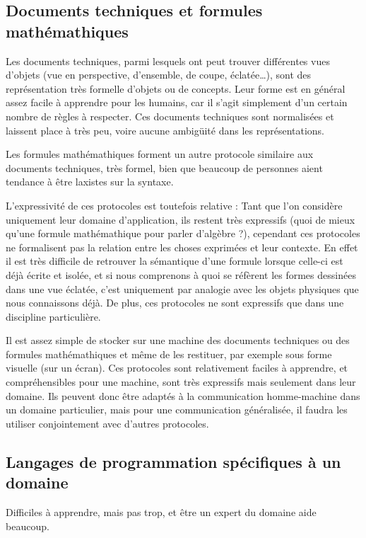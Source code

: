 \documentclass[french,a4paper]{article}
\begin{document}
\subsection{Documents techniques et formules mathémathiques}

Les documents techniques, parmi lesquels ont peut trouver différentes vues d'objets (vue en perspective, d'ensemble, de coupe, éclatée…),
sont des représentation très formelle d'objets ou de concepts. Leur forme est en général assez facile à apprendre pour les humains, car il
s'agit simplement d'un certain nombre de règles à respecter. Ces documents techniques sont normalisées et laissent place à très peu, voire
aucune ambigüité dans les représentations.

Les formules mathémathiques forment un autre protocole similaire aux documents techniques, très formel, bien que beaucoup de personnes aient
tendance à être laxistes sur la syntaxe.

L'expressivité de ces protocoles est toutefois relative : Tant que l'on considère uniquement leur domaine d'application, ils restent très
expressifs (quoi de mieux qu'une formule mathémathique pour parler d'algèbre ?), cependant ces protocoles ne formalisent pas la relation
entre les choses exprimées et leur contexte. En effet il est très difficile de retrouver la sémantique d'une formule lorsque celle-ci est
déjà écrite et isolée, et si nous comprenons à quoi se réfèrent les formes dessinées dans une vue éclatée, c'est uniquement par analogie
avec les objets physiques que nous connaissons déjà. De plus, ces protocoles ne sont expressifs que dans une discipline particulière.

Il est assez simple de stocker sur une machine des documents techniques ou des formules mathémathiques et même de les restituer, par exemple
sous forme visuelle (sur un écran). Ces protocoles sont relativement faciles à apprendre, et compréhensibles pour une machine, sont très
expressifs mais seulement dans leur domaine. Ils peuvent donc être adaptés à la communication homme-machine dans un domaine particulier,
mais pour une communication généralisée, il faudra les utiliser conjointement avec d'autres protocoles.

\subsection{Langages de programmation spécifiques à un domaine}

Difficiles à apprendre, mais pas trop, et être un expert du domaine aide beaucoup.
\end{document}
